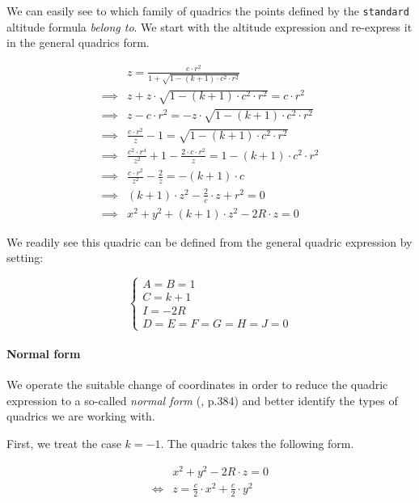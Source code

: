 We can easily see to which family of quadrics the points defined by the
\lstinline{standard} altitude formula \emph{belong to}. We start with
the altitude expression and re-express it in the general quadrics form.

\begin{equation} \begin{split}
&z = \frac{c \cdot r^2}{1 + \sqrt{1 - (k + 1) \cdot c^2 \cdot r^2}} \\
\implies & z + z \cdot \sqrt{1 - (k+1) \cdot c^2 \cdot r^2} = c \cdot r^2 \\
\implies & z - c \cdot r^2 = - z \cdot \sqrt{1 - (k + 1) \cdot c^2 \cdot r^2} \\
\implies & \frac{c \cdot r^2}{z} - 1 = \sqrt{1 - (k + 1) \cdot c^2 \cdot r^2} \\
\implies & \frac{c^2 \cdot r^4}{z^2} + 1 - \frac{2 \cdot c \cdot r^2}{z} =
           1 - (k + 1) \cdot c^2 \cdot r^2 \\
\implies & \frac{c \cdot r^2}{z^2} - \frac{2}{z} = - (k + 1) \cdot c \\
\implies & (k + 1) \cdot z^2 - \frac{2}{c} \cdot z + r^2 = 0 \\
\implies & x^2 + y^2 + (k + 1) \cdot z^2 - 2 R \cdot z = 0
\end{split} \end{equation}

We readily see this quadric can be defined from the general quadric expression
by setting:

\begin{equation} \begin{cases}
A = B = 1 \\
C = k + 1 \\
I = -2 R \\
D = E = F = G = H = J = 0
\end{cases} \end{equation}

\paragraph{Normal form}
We operate the suitable change of coordinates in order to reduce the quadric
expression to a so-called \emph{normal form} (\cite{wiki:quadric},
\cite{Venit:2008} p.384) and better identify the types of quadrics we are
working with.

First, we treat the case $k=-1$.
The quadric takes the following form.

\begin{equation} \begin{split}
&x^2 + y^2 - 2 R \cdot z = 0 \\
\iff &z = \frac{c}{2} \cdot x^2 + \frac{c}{2} \cdot y^2
\end{split} \end{equation}

